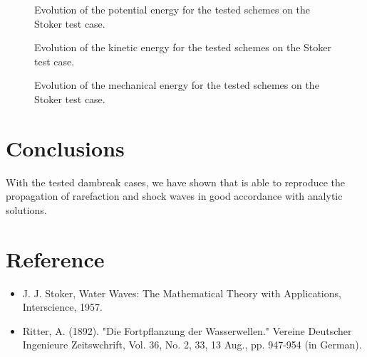 \begin{figure}[H]
\centering
  \caption{Evolution of the potential energy for the tested schemes on the Stoker test case.}
\label{fig:stoker:Ep}
\end{figure}

\begin{figure}[H]
\centering
  \caption{Evolution of the kinetic energy for the tested schemes on the Stoker test case.}
\label{fig:stoker:Ec}
\end{figure}

\begin{figure}[H]
\centering
  \caption{Evolution of the mechanical energy for the tested schemes on the Stoker test case.}
\label{fig:stoker:Em}
\end{figure}

\section{ Conclusions}

With the tested dambreak cases, we have shown that  is able to reproduce the propagation
of rarefaction and shock waves in good accordance with analytic solutions.

\section{Reference}

\begin{itemize}
\item J. J. Stoker, Water Waves: The Mathematical Theory with Applications, Interscience, 1957.
\item Ritter, A. (1892). "Die Fortpflanzung der Wasserwellen." Vereine Deutscher Ingenieure Zeitswchrift, Vol. 36, No. 2, 33,
13 Aug., pp. 947-954 (in German).
\end{itemize}
